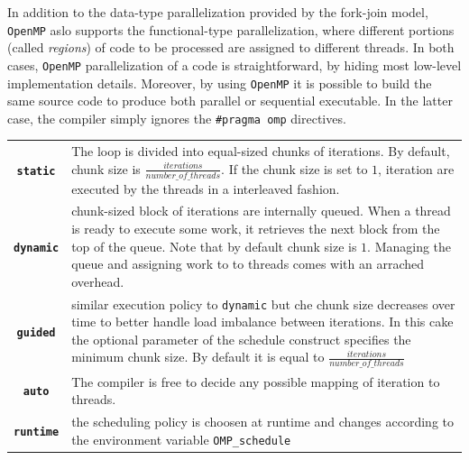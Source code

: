 \begin{description}
    In addition to the data-type parallelization provided by the
    fork-join model, \texttt{OpenMP} aslo supports the functional-type
    parallelization, where different portions (called \textit{regions}) of code to be
    processed are assigned to different threads. In both cases, \texttt{OpenMP}
    parallelization of a code is straightforward, by hiding most
    low-level implementation details.
    Moreover, by using \texttt{OpenMP} it is
    possible to build the same source code to produce both parallel or
    sequential executable. In the latter case, the compiler simply
    ignores the \texttt{\#pragma omp} directives.
    \begin{table}
    	   	\begin{tabularx}{1.0\textwidth}{cX}
    		\rowcolor{gray!35}	
    		\heading{\textbf{Scheduling Kind}} &  \heading{\textbf{Description}} \\ \hline
    		\rowcolor{gray!15}
    		\texttt{\textbf{static}} & The loop is divided into equal-sized chunks of iterations. By default, chunk size is $\frac{iterations}{number\_of\_threads}$. If the chunk size is set to $1$, iteration are executed by the threads in a interleaved fashion.\\ \hline
    		\rowcolor{gray!5}
    		\texttt{\textbf{dynamic}} & chunk-sized block of iterations are internally queued. When a thread is ready to execute some work, it retrieves the next block  from the top of the queue. Note that by default chunk size is $1$. Managing the queue and assigning work to  to threads comes with an arrached overhead.\\ \hline
    		
    		\rowcolor{gray!15}
    		\texttt{\textbf{guided}} & similar execution policy  to \texttt{dynamic} but che chunk size decreases over time to better handle load imbalance between iterations. In this cake the optional parameter of the schedule construct specifies the minimum chunk size. By default it is equal to $\frac{iterations}{number\_of\_threads}$\\ \hline
    		
    		\rowcolor{gray!5}
    		\texttt{\textbf{auto}} & The compiler is free to decide any possible mapping of iteration to threads.\\ \hline
    		
    		\rowcolor{gray!15}
    		\texttt{\textbf{runtime}} & the scheduling policy is choosen at runtime and changes according to the environment variable \verb|OMP_schedule| \\ \hline
    	\end{tabularx}
    

\end{table}
\end{description}
